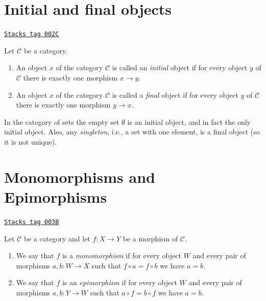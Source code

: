 \section{Initial and final objects}
\label{categories-section-initial-final}
\begin{definition}
\label{categories-definition-initial-final}
\href{https://stacks.math.columbia.edu/tag/002C}{\texttt{Stacks tag 002C}}

Let $\mathcal{C}$ be a category.
\begin{enumerate}
\item An object $x$ of the category $\mathcal{C}$ is called
an {\it initial} object if for every object $y$ of $\mathcal{C}$
there is exactly one morphism $x \to y$.
\item An object $x$ of the category $\mathcal{C}$ is called
a {\it final} object if for every object $y$ of $\mathcal{C}$
there is exactly one morphism $y \to x$.
\end{enumerate}
\end{definition}

In the category of sets the empty set $\emptyset$ is an
initial object, and in fact the only initial object.
Also, any {\it singleton}, i.e., a set with one element,
is a final object (so it is not unique).

\section{Monomorphisms and Epimorphisms}
\label{categories-section-mono-epi}
\begin{definition}
\label{categories-definition-mono-epi}
\href{https://stacks.math.columbia.edu/tag/003B}{\texttt{Stacks tag 003B}}

Let $\mathcal{C}$ be a category and let $f : X \to Y$ be
a morphism of $\mathcal{C}$.
\begin{enumerate}
\item We say that $f$ is a {\it monomorphism} if for every object
$W$ and every pair of morphisms $a, b : W \to X$ such that
$f \circ a = f \circ b$ we have $a = b$.
\item We say that $f$ is an {\it epimorphism} if for every object
$W$ and every pair of morphisms $a, b : Y \to W$ such that
$a \circ f = b \circ f$ we have $a = b$.
\end{enumerate}
\end{definition}

